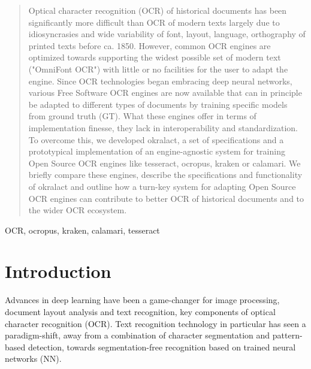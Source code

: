 \documentclass[conference]{IEEEtran}
\begin{document}
\begin{abstract}

Optical character recognition (OCR) of historical documents has
been significantly more difficult than OCR of modern texts
largely due to idiosyncrasies and wide variability of font,
layout, language, orthography of printed texts before ca.
1850. However, common OCR engines are optimized towards
supporting the widest possible set of modern text ("OmniFont
OCR") with little or no facilities for the user to adapt the
engine. Since OCR technologies began embracing deep neural
networks, various Free Software OCR engines are now available
that can in principle be adapted to different types of
documents by training specific models from ground truth (GT).
What these engines offer in terms of implementation finesse,
they lack in interoperability and standardization. To overcome
this, we developed okralact, a set of specifications and a
prototypical implementation of an engine-agnostic system for
training Open Source OCR engines like tesseract, ocropus,
kraken or calamari. We briefly compare these engines, describe
the specifications and functionality of okralact and outline
how a turn-key system for adapting Open Source OCR engines can
contribute to better OCR of historical documents and to the
wider OCR ecosystem.

\end{abstract}

\begin{IEEEkeywords}
OCR, ocropus, kraken, calamari, tesseract
\end{IEEEkeywords}

\section{Introduction}


Advances in deep learning have been a game-changer for image
processing, document layout analysis and text recognition, key components of optical
character recognition (OCR). Text recognition technology in
particular has seen a paradigm-shift, away from a combination of character
segmentation and pattern-based detection, towards
segmentation-free recognition based on trained neural networks
(NN).
\end{document}
